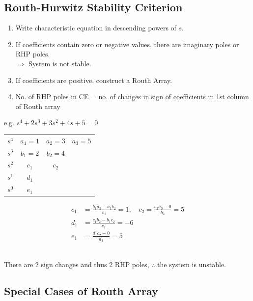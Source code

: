 \documentclass[a4paper]{article}
\begin{document}
\subsection{Routh-Hurwitz Stability Criterion}
\begin{enumerate}
    \item Write characteristic equation in descending powers of $s$.
    \item If coefficients contain zero or negative values, there are imaginary poles or RHP poles.\\
    $\Rightarrow$ System is not stable.
    \item If coefficients are positive, construct a Routh Array.
    \item No. of RHP poles in CE = no. of changes in sign of coefficients in 1st column of Routh array
\end{enumerate}

e.g. $s^4+2s^3+3s^2+4s+5=0$\\
\begin{minipage}{0.3\textwidth}
\begin{table}[H]
\begin{tabular}{cccc}
$s^4$ & $a_1 = 1$ & $a_2 = 3$ & $a_3 = 5$ \\
$s^3$ & $b_1 = 2$ & $b_2 = 4$ &           \\
$s^2$ & $c_1$     & $c_2$     &           \\
$s^1$ & $d_1$     &           &           \\
$s^0$ & $e_1$     &           &          
\end{tabular}
\end{table}
\end{minipage}
\begin{minipage}{0.7\textwidth}
\begin{align*}
    c_1 &= \frac{b_1a_2-a_1b_2}{b_1}= 1,\quad c_2 = \frac{b_2a_3-0}{b_2}=5\\
    d_1 &= \frac{c_1b_2-b_1c_2}{c_1} = -6\\
    e_1 &= \frac{d_1c_2-0}{d_1} = 5
\end{align*}
\end{minipage}
\mbox{}\\
There are 2 sign changes and thus 2 RHP poles, $\therefore$ the system is unstable.

\subsection{Special Cases of Routh Array}
\end{document}

